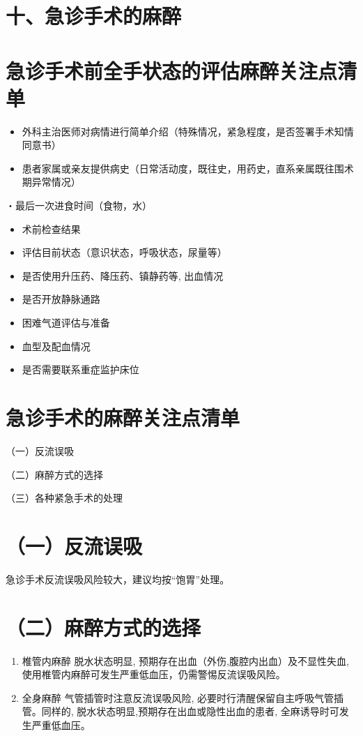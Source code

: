 \documentclass[10pt]{article}
\begin{document}
\section*{十、急诊手术的麻醉}
\section*{急诊手术前全手状态的评估麻醉关注点清单}
\begin{itemize}
  \item 外科主治医师对病情进行简单介绍（特殊情况，紧急程度，是否签署手术知情同意书）
  \item 患者家属或亲友提供病史（日常活动度，既往史，用药史，直系亲属既往围术期异常情况）
\end{itemize}

・最后一次进食时间（食物，水）

\begin{itemize}
  \item 术前检查结果
  \item 评估目前状态（意识状态，呼吸状态，尿量等）
  \item 是否使用升压药、降压药、镇静药等, 出血情况
  \item 是否开放静脉通路
  \item 困难气道评估与准备
  \item 血型及配血情况
  \item 是否需要联系重症监护床位
\end{itemize}

\section*{急诊手术的麻醉关注点清单}
（一）反流误吸

（二）麻醉方式的选择

（三）各种紧急手术的处理

\section*{（一）反流误吸}
急诊手术反流误吸风险较大，建议均按“饱胃”处理。

\section*{（二）麻醉方式的选择}
\begin{enumerate}
  \item 椎管内麻醉 脱水状态明显, 预期存在出血（外伤,腹腔内出血）及不显性失血, 使用椎管内麻醉可发生严重低血压，仍需警惕反流误吸风险。

  \item 全身麻醉 气管插管时注意反流误吸风险, 必要时行清醒保留自主呼吸气管插管。同样的, 脱水状态明显,预期存在出血或隐性出血的患者, 全麻诱导时可发生严重低血压。

\end{enumerate}
\end{document}
